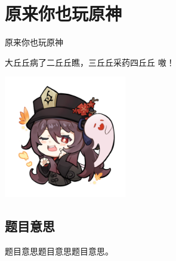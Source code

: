 \def\sectionName{原来你也玩原神}
\section{\sectionName}



\begin{frame}

\isBeamerMode\relax
    {\Huge \sectionName}\par
\fi




大丘丘病了二丘丘瞧，三丘丘采药四丘丘 嗷！

\begin{center}
\includegraphics[width=0.4\textwidth]{./pic/hutao.png}
\end{center}


\end{frame}

\subsection{题目意思}
\begin{frame} %
题目意思题目意思题目意思。
\end{frame}



